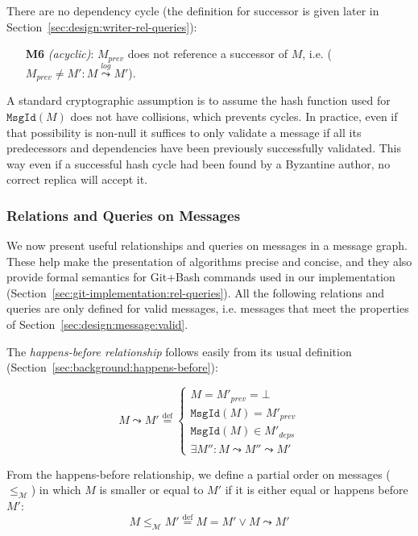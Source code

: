 \documentclass[9pt, oneside]{article}   	%
\newcommand{\defeq}{\overset{\mathrm{def}}{=}}
\newcommand{\logleadsto}{\overset{\textit{log}}\leadsto}
\begin{document}
There are no dependency cycle (the definition for successor is given later in Section~\ref{sec:design:writer-rel-queries}):
\begin{tcolorbox}
\begin{enumerate}
	\item[\textbf{M6}] \textit{(acyclic)}: $M_\textit{prev}$ does not reference a successor of $M$, i.e. ($M_\textit{prev} \neq M' : M \logleadsto M'$).
\end{enumerate}
\end{tcolorbox}

A standard cryptographic assumption is to assume the hash function used for $\texttt{MsgId}(M)$ does not have collisions, which prevents cycles. In practice, even if that possibility is non-null it suffices to only validate a message if all its predecessors and dependencies have been previously successfully validated. This way even if a successful hash cycle had been found by a Byzantine author, no correct replica will accept it.

\subsubsection{Relations and Queries on Messages}
\label{sec:design:queries}

We now present useful relationships and queries on messages in a message graph. These help make the presentation of algorithms  precise and concise, and they also provide formal semantics for Git+Bash commands used in our implementation (Section~\ref{sec:git-implementation:rel-queries}). All the following relations and queries are only defined for valid messages, i.e. messages that meet the properties of Section~\ref{sec:design:message:valid}.


The \textit{happens-before relationship} follows easily from its usual definition (Section~\ref{sec:background:happens-before}):

\begin{equation}
	M \leadsto M' \defeq \begin{cases}
		M = M'_\textit{prev} = \bot \\
		\texttt{MsgId}(M) = M'_\textit{prev} \\
		\texttt{MsgId}(M) \in  M'_\textit{deps} \\
		\exists M'' : M \leadsto M'' \leadsto M'
	\end{cases}
\end{equation}

From the happens-before relationship, we define a partial order on messages ($\leq_\mathcal{M}$) in which $M$ is smaller or equal to $M'$ if it is either equal or happens before $M'$:
\begin{equation}
	M \leq_\mathcal{M} M' \defeq M = M' \vee M \leadsto M' 
\end{equation}
\end{document}
